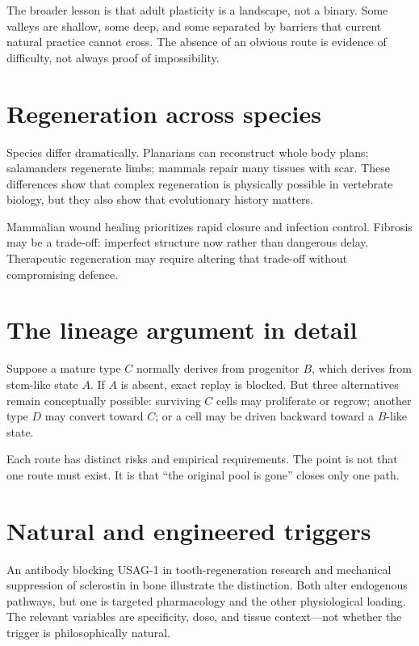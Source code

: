 The broader lesson is that adult plasticity is a landscape, not a binary. Some valleys are shallow, some deep, and some separated by barriers that current natural practice cannot cross. The absence of an obvious route is evidence of difficulty, not always proof of impossibility.

\section{Regeneration across species}\label{regeneration-across-species}

Species differ dramatically. Planarians can reconstruct whole body plans; salamanders regenerate limbs; mammals repair many tissues with scar. These differences show that complex regeneration is physically possible in vertebrate biology, but they also show that evolutionary history matters.

Mammalian wound healing prioritizes rapid closure and infection control. Fibrosis may be a trade-off: imperfect structure now rather than dangerous delay. Therapeutic regeneration may require altering that trade-off without compromising defence.

\section{The lineage argument in detail}\label{the-lineage-argument-in-detail}

Suppose a mature type \(C\) normally derives from progenitor \(B\), which derives from stem-like state \(A\). If \(A\) is absent, exact replay is blocked. But three alternatives remain conceptually possible: surviving \(C\) cells may proliferate or regrow; another type \(D\) may convert toward \(C\); or a cell may be driven backward toward a \(B\)-like state.

Each route has distinct risks and empirical requirements. The point is not that one route must exist. It is that ``the original pool is gone'' closes only one path.

\section{Natural and engineered triggers}\label{natural-and-engineered-triggers}

An antibody blocking USAG-1 in tooth-regeneration research and mechanical suppression of sclerostin in bone illustrate the distinction. Both alter endogenous pathways, but one is targeted pharmacology and the other physiological loading. The relevant variables are specificity, dose, and tissue context---not whether the trigger is philosophically natural.
